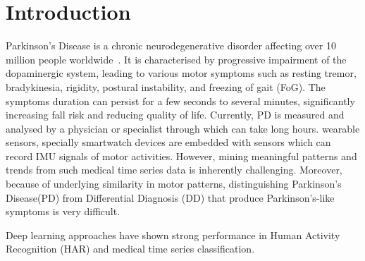 \documentclass[conference]{IEEEtran}
\begin{document}


\section{Introduction}

Parkinson's Disease is a chronic neurodegenerative disorder affecting over 10 million people worldwide~\cite{ref}. It is characterised by progressive impairment of the dopaminergic system, leading to various motor symptoms such as resting tremor, bradykinesia, rigidity, postural instability, and freezing of gait (FoG). The symptoms duration can persist for a few seconds to several minutes, significantly increasing fall risk and reducing quality of life. Currently, PD is measured and analysed by a physician or specialist through which can take long hours.
wearable sensors, specially smartwatch devices are embedded with sensors which can record IMU signals of motor activities. However, mining meaningful patterns and trends from such medical time series data is inherently challenging. Moreover, because of underlying similarity in motor patterns, distinguishing Parkinson's Disease(PD) from Differential Diagnosis (DD)  that produce Parkinson's-like symptoms is very difficult. 

Deep learning approaches have shown strong performance in Human Activity Recognition (HAR) and medical time series classification. 
\end{document}
